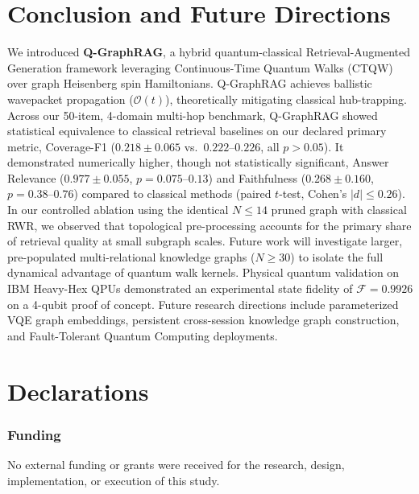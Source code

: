 \documentclass{llncs}
\begin{document}
\section{Conclusion and Future Directions}\label{sec:conclusion}

We introduced \textbf{Q-GraphRAG}, a hybrid quantum-classical Retrieval-Augmented Generation framework leveraging Continuous-Time Quantum Walks (CTQW) over graph Heisenberg spin Hamiltonians. Q-GraphRAG achieves ballistic wavepacket propagation ($\mathcal{O}(t)$), theoretically mitigating classical hub-trapping. Across our 50-item, 4-domain multi-hop benchmark, Q-GraphRAG showed statistical equivalence to classical retrieval baselines on our declared primary metric, Coverage-F1 ($0.218 \pm 0.065$ vs.\ $0.222\text{--}0.226$, all $p > 0.05$). It demonstrated numerically higher, though not statistically significant, Answer Relevance ($0.977 \pm 0.055$, $p = 0.075\text{--}0.13$) and Faithfulness ($0.268 \pm 0.160$, $p = 0.38\text{--}0.76$) compared to classical methods (paired $t$-test, Cohen's $|d| \le 0.26$). In our controlled ablation using the identical $N \le 14$ pruned graph with classical RWR, we observed that topological pre-processing accounts for the primary share of retrieval quality at small subgraph scales. Future work will investigate larger, pre-populated multi-relational knowledge graphs ($N \ge 30$) to isolate the full dynamical advantage of quantum walk kernels. Physical quantum validation on IBM Heavy-Hex QPUs demonstrated an experimental state fidelity of $\mathbf{\mathcal{F} = 0.9926}$ on a 4-qubit proof of concept. Future research directions include parameterized VQE graph embeddings, persistent cross-session knowledge graph construction, and Fault-Tolerant Quantum Computing deployments.

\section*{Declarations}

\subsubsection*{Funding}
No external funding or grants were received for the research, design, implementation, or execution of this study.
\end{document}
